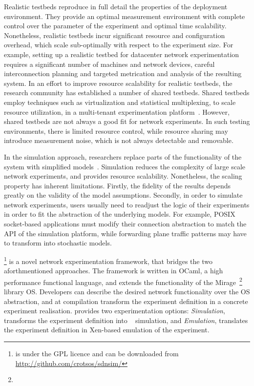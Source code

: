 Realistic testbeds reproduce in full detail the properties of the deployment
environment. They provide an optimal measurement environment with complete
control over the parameter of the experiment and optimal time scalability.
Nonetheless, realistic testbeds incur significant resource and configuration
overhead, which scale sub-optimally with respect to the experiment size.  For
example, setting up a realistic testbed for datacenter network experimentation
requires a significant number of machines and network devices, careful
interconnection planning and targeted metrication and analysis of the resulting
system. In an effort to improve resource scalability for realistic testbeds, the
research community has established a number of shared testbeds. Shared testbeds
employ techniques such as virtualization and statistical multiplexing, to scale
resource utilization, in a multi-tenant experimentation
platform~\cite{planetlab,emulab}.  However, shared testbeds are not always a
good fit for network experiments. In such testing environments, there is limited
resource control, while resource sharing may introduce measurement noise, which
is not always detectable and removable. 

In the simulation approach, researchers replace parts of the functionality of
the system with simplified models~\cite{Varga2008,issariyakul2012}.  Simulation
reduces the complexity of large scale network experiments, and provides resource
scalability. Nonetheless, the scaling property has inherent limitations.
Firstly, the fidelity of the results depends greatly on the validity of the
model assumptions. Secondly, in order to simulate network experiments, users
usually need to readjust the logic of their experiments in order to fit the
abstraction of the underlying models.  For example, POSIX socket-based
applications must modify their connection abstraction to match the API of the
simulation platform, while forwarding plane traffic patterns may have to
transform into stochastic models. 

\sdnsim\footnote{\sdnsim is under the GPL licence and can be downloaded from
  \url{http://github.com/crotsos/sdnsim/}} is a novel network experimentation
framework, that bridges the two aforthmentioned approaches. The framework is
written in OCaml, a high performance functional language, and extends the
functionality of the Mirage~\footnote{\mirageurl} library OS. Developers can
describe the desired network functionality over the \mirage OS abstraction, and
at compilation transform the experiment definition in a concrete experiment realisation.
\sdnsim provides two experimentation options: \emph{Simulation}, transforms
the experiment definition into ~\cite{Henderson2006} simulation, and \emph{Emulation},
translates the experiment definition in Xen-based emulation of the experiment.


